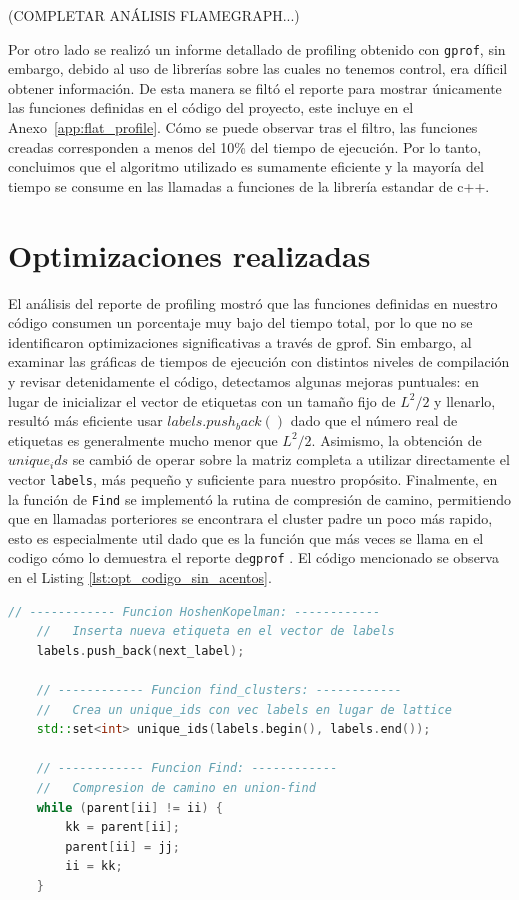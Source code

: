 \documentclass{article}
\begin{document}
(COMPLETAR ANÁLISIS FLAMEGRAPH...)
  
Por otro lado se realizó un informe detallado de profiling obtenido con \texttt{gprof}, sin embargo, debido al uso de librerías sobre las cuales no tenemos control, era díficil obtener información. De esta manera se filtó el reporte para mostrar únicamente las funciones definidas en el código del proyecto, este incluye en el Anexo~\ref{app:flat_profile}. Cómo se puede observar tras el filtro, las funciones creadas corresponden a menos del 10\% del tiempo de ejecución. Por lo tanto, concluimos que el algoritmo utilizado es sumamente eficiente y la mayoría del tiempo se consume en las llamadas a funciones de la librería estandar de c++. 

\section{Optimizaciones realizadas}

El análisis del reporte de profiling mostró que las funciones definidas en nuestro código consumen un porcentaje muy bajo del tiempo total, por lo que no se identificaron optimizaciones significativas a través de gprof. Sin embargo, al examinar las gráficas de tiempos de ejecución con distintos niveles de compilación y revisar detenidamente el código, detectamos algunas mejoras puntuales: en lugar de inicializar el vector de etiquetas con un tamaño fijo de \(L^2/2\) y llenarlo, resultó más eficiente usar \texttt{$labels.push_back()$} dado que el número real de etiquetas es generalmente mucho menor que \(L^2/2\). Asimismo, la obtención de \texttt{$unique_ids$} se cambió de operar sobre la matriz completa a utilizar directamente el vector \texttt{labels}, más pequeño y suficiente para nuestro propósito. Finalmente, en la función de \texttt{Find} se implementó la rutina de compresión de camino, permitiendo que en llamadas porteriores se encontrara el cluster padre un poco más rapido, esto es especialmente util dado que es la función que más veces se llama en el codigo cómo lo demuestra el reporte de\texttt{gprof} . El código mencionado se observa en el Listing \ref{lst:opt_codigo_sin_acentos}. 
 
\begin{lstlisting}[language=C++,caption={Codigo de optimizaciones}, label={lst:opt_codigo_sin_acentos}]
    // ------------ Funcion HoshenKopelman: ------------
    //   Inserta nueva etiqueta en el vector de labels
    labels.push_back(next_label);
    
    // ------------ Funcion find_clusters: ------------
    //   Crea un unique_ids con vec labels en lugar de lattice 
    std::set<int> unique_ids(labels.begin(), labels.end()); 

    // ------------ Funcion Find: ------------
    //   Compresion de camino en union-find
    while (parent[ii] != ii) {
        kk = parent[ii];
        parent[ii] = jj;
        ii = kk;
    }
\end{lstlisting}
\end{document}
